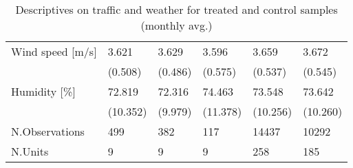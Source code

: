 \begin{table}[!htb]
\begin{tabular}{llllll}
  Wind speed [m/s] & 3.621 & 3.629 & 3.596 & 3.659 & 3.672 \\ 
   & (0.508) & (0.486) & (0.575) & (0.537) & (0.545) \\ 
  Humidity [\%] & 72.819 & 72.316 & 74.463 & 73.548 & 73.642 \\ 
   & (10.352) & (9.979) & (11.378) & (10.256) & (10.260) \\ 
\midrule N.Observations & 499&382&117&14437&10292\\
 N.Units & 9&9&9&258&185\\
   \bottomrule
\end{tabular}
\endgroup
\caption{Descriptives on traffic and weather for treated and control samples (monthly avg.)} 
\end{table}
